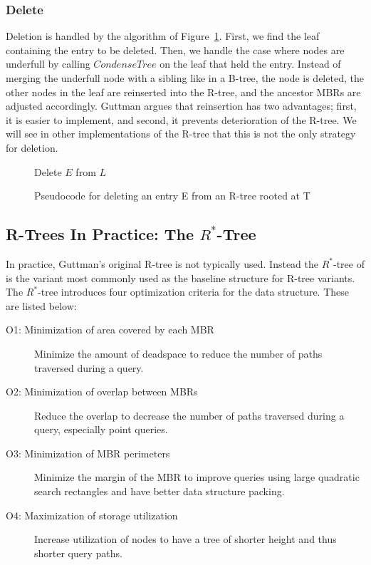 \subsubsection{Delete}
Deletion is handled by the algorithm of Figure~\ref{fig:R_Tree_Delete}. First,
we find the leaf containing the entry to be deleted. Then, we handle the case
where nodes are underfull by calling $CondenseTree$ on the leaf that held
the entry. Instead of merging the underfull node with a sibling like in a 
B-tree, the node is deleted, the other nodes in the leaf are reinserted into 
the R-tree, and the ancestor MBRs are adjusted accordingly. Guttman argues that
reinsertion has two advantages; first, it is easier to implement, and second, 
it prevents deterioration of the R-tree. We will see in other implementations
of the R-tree that this is not the only strategy for deletion.

\begin{figure}[t]
\begin{algorithmic}
	\State {}
	\State Delete $E$ from $L$
	\State {}
\EndFunction
\end{algorithmic}
\caption{Pseudocode for deleting an entry E from an R-tree rooted at T}
\label{fig:R_Tree_Delete}
\end{figure}


\subsection{R-Trees In Practice: The $R^{*}$-Tree}
\label{sec:variants}
In practice, Guttman's original R-tree is not typically used. Instead the 
$R^{*}$-tree of \cite{beckmannkriegelschneiderseeger90} is the variant most 
commonly used as the baseline structure for R-tree variants. The 
$R^{*}$-tree introduces four optimization criteria for the data structure. 
These are listed below:

\begin{description}
	\item[O1: Minimization of area covered by each MBR] Minimize the amount of 
		deadspace to reduce the number of paths traversed during a query.
	\item[O2: Minimization of overlap between MBRs] Reduce the overlap to decrease the
		number of paths traversed during a query, especially point queries.
	\item[O3: Minimization of MBR perimeters] Minimize the margin of the MBR to 
		improve queries using large quadratic search rectangles and have better 
		data structure packing.
	\item[O4: Maximization of storage utilization] Increase utilization of nodes to 
		have a tree of shorter height and thus shorter query paths.
\end{description}

